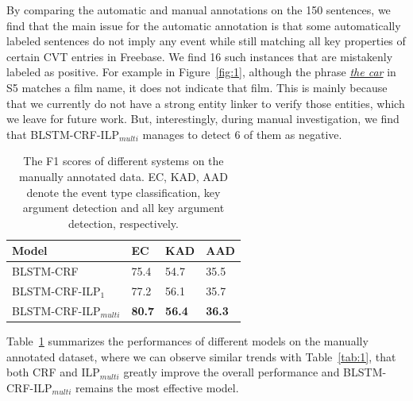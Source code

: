 By comparing the automatic and manual annotations on the 150 sentences, we find that
the main issue for the automatic annotation is that some automatically labeled sentences
do not imply any event while still matching all key properties of certain CVT entries in Freebase.
We find 16 such instances that are mistakenly labeled as positive.
For example in Figure~\ref{fig:1}, although the phrase \underline{\emph{the car}} in S5 matches a film name,
it does not indicate that film. %
This is mainly because that we currently do not have a strong entity linker to verify those entities, which we leave for
future work.
But, interestingly,
during manual investigation,
we find that BLSTM-CRF-ILP$_{multi}$ manages to detect 6 of them as negative.


\begin{table}[h]
\small
\centering
\begin{tabular}{|l|p{0.8cm}<{\centering}|p{0.8cm}<{\centering}|p{0.8cm}<{\centering}|} \hline
	Model & EC & KAD & AAD \\ \hline
	BLSTM-CRF & 75.4 & 54.7 & 35.5 \\ \hline
	BLSTM-CRF-ILP$_{1}$ & 77.2 & 56.1 & 35.7 \\ \hline
	BLSTM-CRF-ILP$_{multi}$ & \textbf{80.7} & \textbf{56.4} & \textbf{36.3} \\ \hline
\end{tabular}
\caption{The F1 scores of different systems on the manually annotated data. EC, KAD, AAD denote the event type classification, key argument detection and all key argument detection, respectively. \label{tab:2}}
\end{table}

Table~\ref{tab:2} summarizes the performances of different models on the manually annotated dataset, where we can observe similar trends with Table~\ref{tab:1}, that
both CRF and ILP$_{multi}$ greatly improve the overall performance and
BLSTM-CRF-ILP$_{multi}$ remains the most effective model. %

